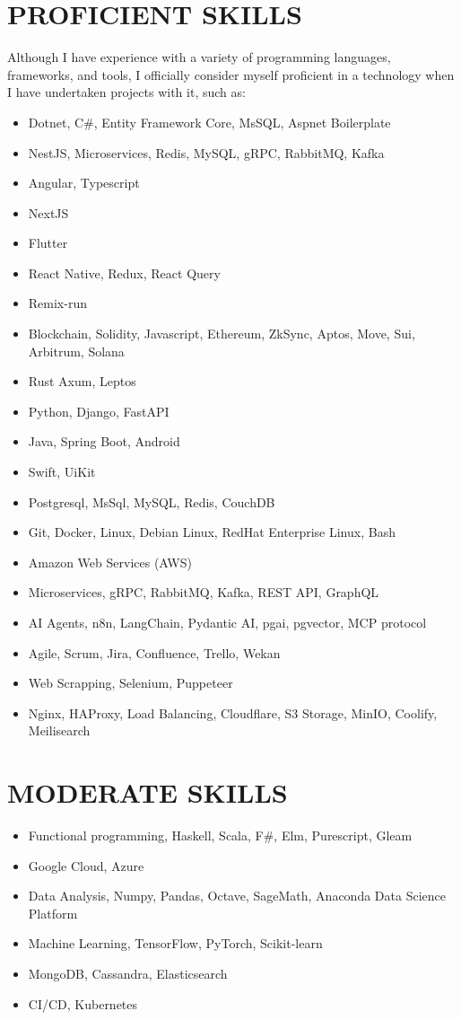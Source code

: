 \documentclass[line,margin]{res}
\begin{document}
\begin{resume}
\noindent\hrulefill
\section{\textbf{PROFICIENT SKILLS}} Although I have experience with a variety of programming languages, frameworks, and tools, I officially consider myself proficient in a technology when I have undertaken projects with it, such as:
\begin{itemize}
\item Dotnet, C\#, Entity Framework Core, MsSQL, Aspnet Boilerplate
\item NestJS, Microservices, Redis, MySQL, gRPC, RabbitMQ, Kafka
\item Angular, Typescript
\item NextJS
\item Flutter
\item React Native, Redux, React Query
\item Remix-run
\item Blockchain, Solidity, Javascript, Ethereum, ZkSync, Aptos, Move, Sui, Arbitrum, Solana
\item Rust Axum, Leptos
\item Python, Django, FastAPI
\item Java, Spring Boot, Android
\item Swift, UiKit
\item Postgresql, MsSql, MySQL, Redis, CouchDB 
\item Git, Docker, Linux, Debian Linux, RedHat Enterprise Linux, Bash
\item Amazon Web Services (AWS)
\item Microservices, gRPC, RabbitMQ, Kafka, REST API, GraphQL
\item AI Agents, n8n, LangChain, Pydantic AI, pgai, pgvector, MCP protocol
\item Agile, Scrum, Jira, Confluence, Trello, Wekan
\item Web Scrapping, Selenium, Puppeteer
\item Nginx, HAProxy, Load Balancing, Cloudflare, S3 Storage, MinIO, Coolify, Meilisearch
\end{itemize}

\noindent\hrulefill
\section{\textbf{MODERATE SKILLS}}
\begin{itemize}
        \item Functional programming, Haskell, Scala, F\#, Elm, Purescript, Gleam
        \item Google Cloud, Azure
        \item Data Analysis, Numpy, Pandas, Octave, SageMath, Anaconda Data Science Platform
        \item Machine Learning, TensorFlow, PyTorch, Scikit-learn
        \item MongoDB, Cassandra, Elasticsearch
        \item CI/CD, Kubernetes
\end{itemize}
 

\end{resume}
\end{document}
